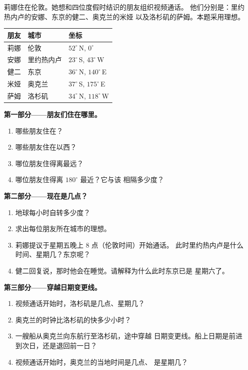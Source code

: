 \begin{problem}
\label{pb:g6:latitude-longitude:1}
莉娜住在伦敦。她想和四位度假时结识的朋友组织视频通话。
他们分别是：里约热内卢的安娜、东京的健二、奥克兰的米娅
以及洛杉矶的萨姆。本题采用理想。

\begin{center}
\small
\begin{tabular}{lll}
\hline
朋友 & 城市 & 坐标 \\
\hline
莉娜 & 伦敦 & $52^\circ$\,N, $0^\circ$\\
安娜 & 里约热内卢 & $23^\circ$\,S, $43^\circ$\,W\\
健二 & 东京 & $36^\circ$\,N, $140^\circ$\,E\\
米娅 & 奥克兰 & $37^\circ$\,S, $175^\circ$\,E\\
萨姆 & 洛杉矶 & $34^\circ$\,N, $118^\circ$\,W\\
\hline
\end{tabular}
\end{center}

\medskip
\noindent\textbf{第一部分——朋友们住在哪里。}
\begin{enumerate}
  \item 哪些朋友住在？
  \item 哪些朋友住在以西？
  \item 哪位朋友住得离最远？
  \item 哪位朋友住得离 $180^\circ$ 最近？它与该
        相隔多少度？
\end{enumerate}

\medskip
\noindent\textbf{第二部分——现在是几点？}
\begin{enumerate}[resume]
  \item 地球每小时自转多少度？
  \item 求出每位朋友所在城市的理想。
  \item 莉娜提议于星期五晚上 8 点（伦敦时间）开始通话。
        此时里约热内卢是什么时间、星期几？东京呢？
  \item 健二回复说，那时他会在睡觉。请解释为什么此时东京已是
        星期六了。
\end{enumerate}

\medskip
\noindent\textbf{第三部分——穿越日期变更线。}
\begin{enumerate}[resume]
  \item 视频通话开始时，洛杉矶是几点、星期几？
  \item 奥克兰的时钟比洛杉矶的快多少小时？
  \item 一艘船从奥克兰向东航行至洛杉矶，途中穿越
        日期变更线。船上日期是前进到次日，还是退回前一日？
  \item 视频通话开始时，奥克兰的当地时间是几点、
        是星期几？
\end{enumerate}
\end{problem}
